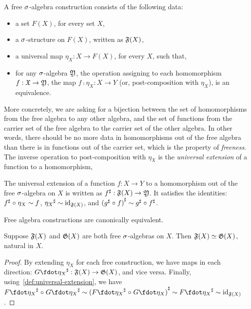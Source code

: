 \begin{definition}
    \label{def:free-algebras}
    A free $\sigma$-algebra construction consists of the following data:
    \begin{itemize}
        \item a set $F(X)$, for every set $X$,
        \item a $\sigma$-structure on $F(X)$, written as $\mathfrak{F}(X)$,
        \item a universal map $\eta_X : X \to F(X)$, for every $X$, such that,
        \item for any $\sigma$-algebra $\mathfrak{Y}$, the operation
              assigning to each homomorphism $f : \mathfrak{X} \to \mathfrak{Y}$,
              the map ${f \comp \eta_X : X \to Y}$ (or, post-composition with $\eta_X$),
              is an equivalence.
    \end{itemize}
\end{definition}
More concretely,
we are asking for a bijection between the set of homomorphisms from the free algebra to any other algebra,
and the set of functions from the carrier set of the free algebra to the carrier set of the other algebra.
%
In other words, there should be no more data in homomorphisms out of the free algebra than there is in functions out of
the carrier set, which is the property of \emph{freeness}.
%
The inverse operation to post-composition with $\eta_X$ is the \emph{universal extension} of a function to a homomorphism,
%
\begin{definition}
    \label{def:universal-extension}
    The universal extension of a function $f : X \to Y$ to a homomorphism out of the free $\sigma$-algebra on $X$ is written
    as ${f}^{\sharp} : \mathfrak{F}(X) \to \mathfrak{Y}$.
    It satisfies the identities: ${f}^{\sharp} \mathrel{\circ} \eta_X \mathrel{\sim} f$, $\ext{\eta_{X}} \htpy \idfunc_{\str{F}(X)}$,
    and ${({g}^{\sharp} \mathrel{\circ} f)}^{\sharp} \mathrel{\sim} {g}^{\sharp} \mathrel{\circ} {f}^{\sharp}$.
\end{definition}
\noindent
Free algebra constructions are canonically equivalent.
\begin{propositionrep}
    \label{lem:free-algebras-unique}
    Suppose $\mathfrak{F}(X)$ and $\mathfrak{G}(X)$ are both free $\sigma$-algebras on $X$.
    Then $\mathfrak{F}(X) \mathrel{\simeq} \mathfrak{G}(X)$, natural in $X$.
\end{propositionrep}
\begin{proof}
    By extending $\eta_X$ for each free construction,
    we have maps in each direction:
    ${\ext{G\fdot\eta_{X}} : \str{F}(X) \to \str{G}(X)}$, and vice versa.
    Finally, using~\cref{def:universal-extension}, we have
    \(
    {\ext{F\fdot\eta_{X}} \comp \ext{G\fdot\eta_{X}}} \htpy
    {\ext{(\ext{F\fdot\eta_{X}} \comp G\fdot\eta_{X})}} \htpy
    {\ext{F\fdot\eta_{X}}} \htpy
    {\idfunc_{\str{F}(X)}}
    \).
\end{proof}
